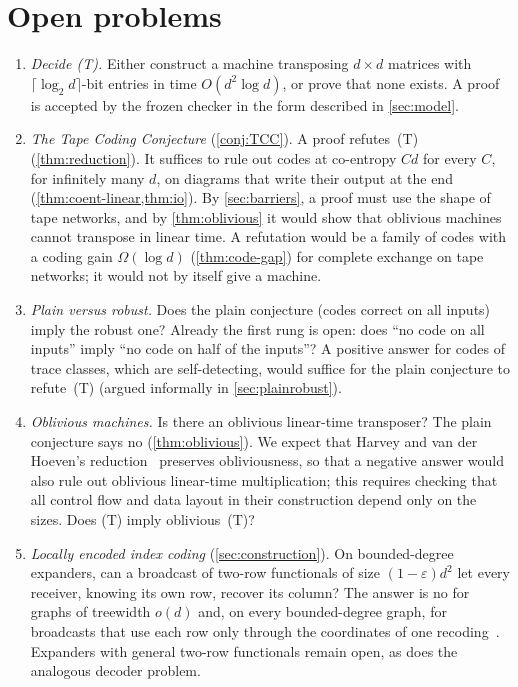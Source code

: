 \section{Open problems}\label{sec:open}

\begin{enumerate}[label=\arabic*.,leftmargin=2em]
\item \emph{Decide (T).} Either construct a machine transposing $d\times d$ matrices with $\lceil\log_2d\rceil$-bit
entries in time $O(d^2\log d)$, or prove that none exists. A proof is accepted by the frozen checker in the form
described in \cref{sec:model}.

\item \emph{The Tape Coding Conjecture} (\cref{conj:TCC}). A proof refutes~(T) (\cref{thm:reduction}). It suffices to
rule out codes at co-entropy $Cd$ for every $C$, for infinitely many $d$, on diagrams that write their output at the
end (\cref{thm:coent-linear,thm:io}). By \cref{sec:barriers}, a proof must use the shape of tape networks, and by \cref{thm:oblivious} it
would show that oblivious machines cannot transpose in linear time. A refutation would be a family of codes with a
coding gain $\Omega(\log d)$ (\cref{thm:code-gap}) for complete exchange on tape networks; it would not by itself give
a machine.

\item \emph{Plain versus robust.} Does the plain conjecture (codes correct on all inputs) imply the robust one? Already
the first rung is open: does ``no code on all inputs'' imply ``no code on half of the inputs''? A positive answer
for codes of trace classes, which are self-detecting, would suffice for the plain conjecture to refute~(T) (argued
informally in \cref{sec:plainrobust}).

\item \emph{Oblivious machines.} Is there an oblivious linear-time transposer? The plain conjecture says no
(\cref{thm:oblivious}). We expect that Harvey and van der Hoeven's reduction~\cite{HvdH2025} preserves obliviousness,
so that a negative answer would also rule out oblivious linear-time multiplication; this requires checking that all
control flow and data layout in their construction depend only on the sizes. Does (T) imply oblivious~(T)?

\item \emph{Locally encoded index coding} (\cref{sec:construction}). On bounded-degree expanders, can a broadcast of two-row functionals of size $(1-\varepsilon)d^2$ let every receiver, knowing its own row, recover its column? The answer is no for graphs of treewidth $o(d)$ and, on every bounded-degree graph, for broadcasts that use each row only through the coordinates of one recoding~\cite{BrendeAstra2026}. Expanders with general two-row functionals remain open, as does the analogous decoder problem.


\end{enumerate}
